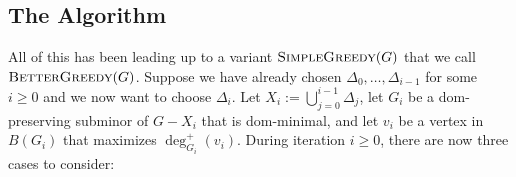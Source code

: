 \documentclass[12pt]{article}
\theoremstyle{definition}
\begin{document}
\subsection{The Algorithm}

All of this has been leading up to a variant  $\textsc{SimpleGreedy}(G)$ that we call $\textsc{BetterGreedy}(G)$.  Suppose we have already chosen $\Delta_0,\ldots,\Delta_{i-1}$ for some $i\ge 0$ and we now want to choose $\Delta_i$.  Let $X_i:=\bigcup_{j=0}^{i-1}\Delta_j$, let $G_i$ be a dom-preserving subminor of $G-X_i$ that is dom-minimal, and let $v_i$ be a vertex in $B(G_i)$ that maximizes $\deg^+_{G_i}(v_i)$.  During iteration $i\ge 0$, there are now three cases to consider:
\end{document}
